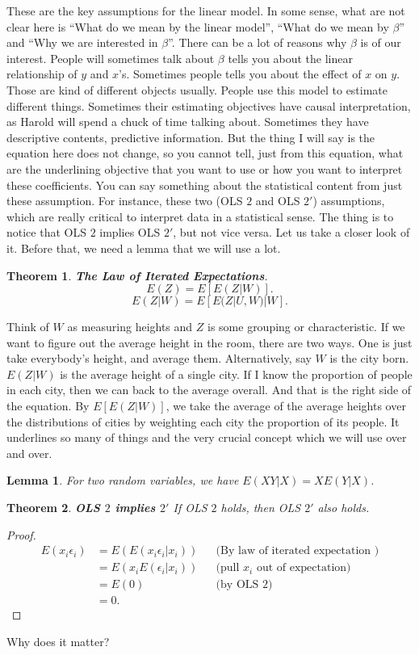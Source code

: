 \documentclass[11pt,a4paper]{amsart}
\theoremstyle{plain}
\newtheorem{theorem}{Theorem}
\newtheorem{lemma}{Lemma}
\theoremstyle{definition}
\begin{document}
	These are the key assumptions for the linear model. In some sense, what are not clear here is ``What do we mean by the linear model'', ``What do we mean by $\beta$'' and ``Why we are interested in $\beta$''. There can be a lot of reasons why $\beta$ is of our interest. People will sometimes talk about $\beta$ tells you about the linear relationship of $y$ and $x$'s. Sometimes people tells you about the effect of $x$ on $y$. Those are kind of different objects usually. People use this model to estimate different things. Sometimes their estimating objectives have causal interpretation, as Harold will spend a chuck of time talking about. Sometimes they have descriptive contents, predictive information. But the thing I will say is the equation here does not change, so you cannot tell, just from this equation, what are the underlining objective that you want to use or how you want to interpret these coefficients. You can say something about the statistical content from just these assumption.  For instance, these two (OLS $2$ and OLS $2'$) assumptions, which are really critical to interpret data in a statistical sense. The thing is to notice that OLS $2$ implies OLS $2'$, but not vice versa. Let us take a closer look of it. Before that, we need a lemma that we will use a lot.
	
	\begin{theorem}
		\textbf{The Law of Iterated Expectations}.  
		\[	E(Z) = E[E(Z | W)].	\]
		\[	E(Z | W) = E[E(Z | U,W) | W].	\] 
	\end{theorem}
	Think of $W$ as measuring heights and $Z$ is some grouping or characteristic. If we want to figure out the average height in the room, there are two ways. One is just take everybody's height, and average them. Alternatively, say $W$ is the city born. $E(Z | W)$ is the average height of a single city. If I know the proportion of people in each city, then we can back to the average overall. And that is the right side of the equation. By $E[E(Z | W)]$, we take the average of the average heights over the distributions of cities by weighting each city the proportion of its people. It underlines so many of things and the very crucial concept which we will use over and over.
	
	\begin{lemma}
		For two random variables, we have $E(XY|X)=XE(Y |X)$.
	\end{lemma}

	\begin{theorem}
		\textbf{OLS $2$ implies $2'$} If OLS $2$ holds, then OLS $2'$ also holds.
	\end{theorem}
	\begin{proof}
		\begin{align*}
			E(x_{i}\epsilon_{i}) &= E(E(x_{i}\epsilon_{i} | x_{i})) &&\text{(By law of iterated expectation )} \\
			&= E(x_{i}E(\epsilon_{i} | x_{i})) &&\text{(pull $x_{i}$ out of expectation)} \\
			&= E(0) &&\text{(by OLS $2$)} \\
			&= 0.
		\end{align*}
	\end{proof}
	Why does it matter?\par 
	
\end{document}
